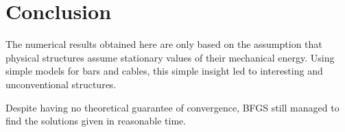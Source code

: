 \section{Conclusion}

The numerical results obtained here are only based on the assumption that physical structures assume stationary values of their mechanical energy. Using simple models for bars and cables, this simple insight led to interesting and unconventional structures.

Despite having no theoretical guarantee of convergence, BFGS still managed to find the solutions given in reasonable time.